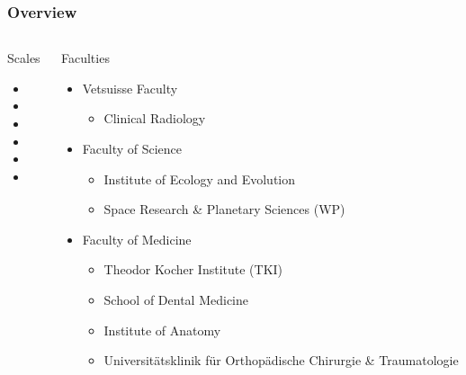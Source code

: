 \documentclass[aspectratio=169]{beamer}
\begin{document}
\begin{frame}
	\frametitle{Overview}
	\begin{columns}
		\begin{column}{0.309\linewidth}
			Scales
			\begin{itemize}
				\item {}%
				\normalsize\item \huge{}
				\normalsize\item \huge{}%
                \normalsize\item \huge{}%
				\normalsize\item \huge{}%
				\normalsize\item \huge{}
			\end{itemize}
		\end{column}
		\begin{column}{0.618\linewidth}
			Faculties
			\begin{itemize}
				\item Vetsuisse Faculty
				\begin{itemize}
				    \item Clinical Radiology
				\end{itemize}
				\item Faculty of Science
				\begin{itemize}
					\item Institute of Ecology and Evolution
					\item Space Research \& Planetary Sciences (WP)
				\end{itemize}	
				\item Faculty of Medicine
				\begin{itemize}
					\item Theodor Kocher Institute (TKI)
					\item School of Dental Medicine
					\item Institute of Anatomy
					\item Universitätsklinik für Orthopädische Chirurgie \& Traumatologie
				\end{itemize}
			\end{itemize}
		\end{column}
	\end{columns}
\end{frame}
\end{document}
